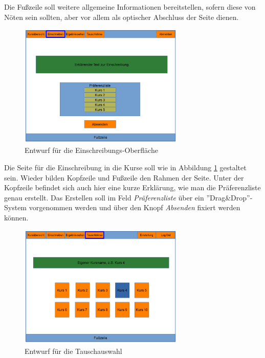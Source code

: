             Die Fußzeile soll weitere allgemeine Informationen bereitstellen, sofern diese von Nöten sein sollten, aber vor allem als optischer Abschluss der Seite dienen.
            \begin{figure}[t]
            	\centering
            	\includegraphics[width=0.7\textwidth]{./design/images/MockUpsFrontend/frontendPreferences.png}
            	\caption{Entwurf für die Einschreibungs-Oberfläche}
            	\label{mockupPreferencesFrontend}
            \end{figure}
            
            Die Seite für die Einschreibung in die Kurse soll wie in Abbildung \ref{mockupPreferencesFrontend} gestaltet sein.
            Wieder bilden Kopfzeile und Fußzeile den Rahmen der Seite.
            Unter der Kopfzeile befindet sich auch hier eine kurze Erklärung, wie man die Präferenzliste genau erstellt.
            Das Erstellen soll im Feld \textit{Präferenzliste} über ein ''Drag\&Drop''-System vorgenommen werden und über den Knopf \textit{Absenden} fixiert werden können.
            
            \begin{figure}[t]
                \centering
                \includegraphics[width=0.7\textwidth]{./design/images/MockUpsFrontend/frontendSwap1.png}
                \caption{Entwurf für die Tauschauswahl}
                \label{mockupResultsFrontend}
            \end{figure}
        
